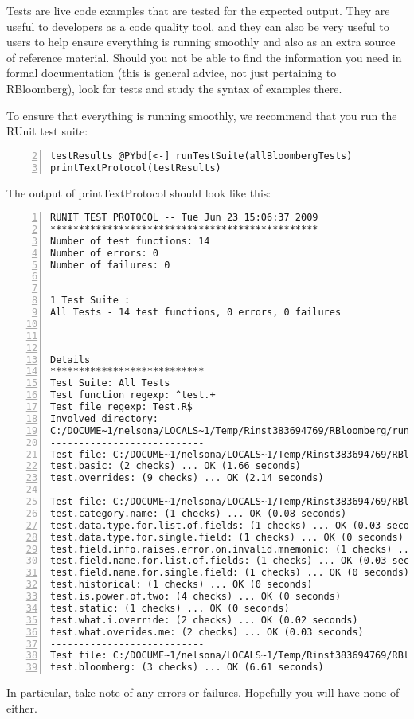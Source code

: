 \documentclass[a4paper]{article}
\begin{document}
Tests are live code examples that are tested for the expected output. They are useful to developers as a code quality tool, and they can also be very useful to users to help ensure everything is running smoothly and also as an extra source of reference material. Should you not be able to find the information you need in formal documentation (this is general advice, not just pertaining to RBloomberg), look for tests and study the syntax of examples there.

To ensure that everything is running smoothly, we recommend that you run the RUnit test suite:

\begin{Verbatim}[commandchars=@\[\],numbers=left,firstnumber=2,stepnumber=1]
testResults @PYbd[<-] runTestSuite(allBloombergTests)
printTextProtocol(testResults)
\end{Verbatim}

    

The output of printTextProtocol should look like this:

\begin{Verbatim}[commandchars=@\[\],numbers=left,firstnumber=1,stepnumber=1]
RUNIT TEST PROTOCOL -- Tue Jun 23 15:06:37 2009 
*********************************************** 
Number of test functions: 14 
Number of errors: 0 
Number of failures: 0 

 
1 Test Suite : 
All Tests - 14 test functions, 0 errors, 0 failures



Details 
*************************** 
Test Suite: All Tests 
Test function regexp: ^test.+ 
Test file regexp: Test.R$ 
Involved directory: 
C:/DOCUME~1/nelsona/LOCALS~1/Temp/Rinst383694769/RBloomberg/runit-tests 
--------------------------- 
Test file: C:/DOCUME~1/nelsona/LOCALS~1/Temp/Rinst383694769/RBloomberg/runit-tests/blpGetDataTest.R 
test.basic: (2 checks) ... OK (1.66 seconds)
test.overrides: (9 checks) ... OK (2.14 seconds)
--------------------------- 
Test file: C:/DOCUME~1/nelsona/LOCALS~1/Temp/Rinst383694769/RBloomberg/runit-tests/blpToolsTest.R 
test.category.name: (1 checks) ... OK (0.08 seconds)
test.data.type.for.list.of.fields: (1 checks) ... OK (0.03 seconds)
test.data.type.for.single.field: (1 checks) ... OK (0 seconds)
test.field.info.raises.error.on.invalid.mnemonic: (1 checks) ... OK (0.02 seconds)
test.field.name.for.list.of.fields: (1 checks) ... OK (0.03 seconds)
test.field.name.for.single.field: (1 checks) ... OK (0 seconds)
test.historical: (1 checks) ... OK (0 seconds)
test.is.power.of.two: (4 checks) ... OK (0 seconds)
test.static: (1 checks) ... OK (0 seconds)
test.what.i.override: (2 checks) ... OK (0.02 seconds)
test.what.overides.me: (2 checks) ... OK (0.03 seconds)
--------------------------- 
Test file: C:/DOCUME~1/nelsona/LOCALS~1/Temp/Rinst383694769/RBloomberg/runit-tests/rcomBloombergTest.R 
test.bloomberg: (3 checks) ... OK (6.61 seconds)
\end{Verbatim}

    

In particular, take note of any errors or failures. Hopefully you will have none of either.


\end{document}
